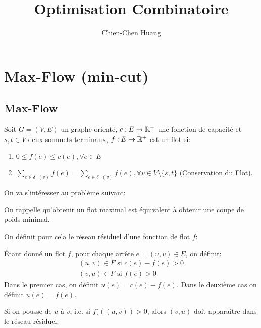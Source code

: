 \documentclass[math, info]{cours}
\title{Optimisation Combinatoire}
\author{Chien-Chen Huang}
\begin{document}
\bettertitle
\section{Max-Flow (min-cut)}
\subsection{Max-Flow}
\begin{definition}
	Soit $G = \left(V, E\right)$ un graphe orienté, $c: E \to \mathbb{R}^{+}$ une fonction de capacité et $s, t \in V$ deux sommets terminaux,
	$f: E\to \mathbb{R}^{+}$ est un flot si:
	\begin{enumerate}
		\item $0 \leq f(e) \leq c(e), \forall e \in E$
		\item $\sum_{e \in \delta^{-}(v)} f(e) = \sum_{e \in \delta^{+}(v)} f(e), \forall v \in V \setminus \{s, t\}$ (Conservation du Flot).
	\end{enumerate}
	\label{def:flot}
\end{definition}

On va s'intéresser au problème suivant:

\begin{thm}
	On rappelle qu'obtenir un flot maximal est équivalent à obtenir une coupe de poids minimal.
\end{thm}

On définit pour cela le réseau résiduel d'une fonction de flot $f$:
\begin{definition}
	Étant donné un flot $f$, pour chaque arrête $e = (u, v) \in E$, on définit:
	\begin{align*}
		(u, v) \in F \text{ si } c(e) - f(e) > 0 \\
		(v, u) \in F \text{ si } f(e) > 0
	\end{align*}
	Dans le premier cas, on définit $u(e) = c(e) - f(e)$. Dans le deuxième cas on définit $u(e) = f(e)$.
	\label{def:residualnetwork}
\end{definition}

\begin{proposition}
	Si on pousse de $u$ à $v$, i.e. si $f(((u, v)) > 0$, alors $(v, u)$ doit apparaître dans le réseau résiduel.
	\label{prop:pakompri}
\end{proposition}
\end{document}
